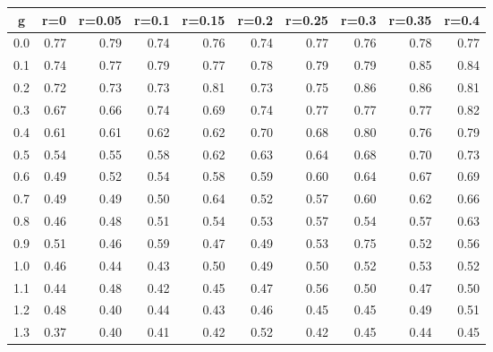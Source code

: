 %
\begin{table}[!tbp]
 \begin{center}
 \begin{tabular}{rrrrrrrrrr}\hline\hline
\multicolumn{1}{c}{g}&\multicolumn{1}{c}{r=0}&\multicolumn{1}{c}{r=0.05}&\multicolumn{1}{c}{r=0.1}&\multicolumn{1}{c}{r=0.15}&\multicolumn{1}{c}{r=0.2}&\multicolumn{1}{c}{r=0.25}&\multicolumn{1}{c}{r=0.3}&\multicolumn{1}{c}{r=0.35}&\multicolumn{1}{c}{r=0.4}\tabularnewline
\hline
0.0&0.77&0.79&0.74&0.76&0.74&0.77&0.76&0.78&0.77\tabularnewline
0.1&0.74&0.77&0.79&0.77&0.78&0.79&0.79&0.85&0.84\tabularnewline
0.2&0.72&0.73&0.73&0.81&0.73&0.75&0.86&0.86&0.81\tabularnewline
0.3&0.67&0.66&0.74&0.69&0.74&0.77&0.77&0.77&0.82\tabularnewline
0.4&0.61&0.61&0.62&0.62&0.70&0.68&0.80&0.76&0.79\tabularnewline
0.5&0.54&0.55&0.58&0.62&0.63&0.64&0.68&0.70&0.73\tabularnewline
0.6&0.49&0.52&0.54&0.58&0.59&0.60&0.64&0.67&0.69\tabularnewline
0.7&0.49&0.49&0.50&0.64&0.52&0.57&0.60&0.62&0.66\tabularnewline
0.8&0.46&0.48&0.51&0.54&0.53&0.57&0.54&0.57&0.63\tabularnewline
0.9&0.51&0.46&0.59&0.47&0.49&0.53&0.75&0.52&0.56\tabularnewline
1.0&0.46&0.44&0.43&0.50&0.49&0.50&0.52&0.53&0.52\tabularnewline
1.1&0.44&0.48&0.42&0.45&0.47&0.56&0.50&0.47&0.50\tabularnewline
1.2&0.48&0.40&0.44&0.43&0.46&0.45&0.45&0.49&0.51\tabularnewline
1.3&0.37&0.40&0.41&0.42&0.52&0.42&0.45&0.44&0.45\tabularnewline
\hline
\end{tabular}

\end{center}

\end{table}

